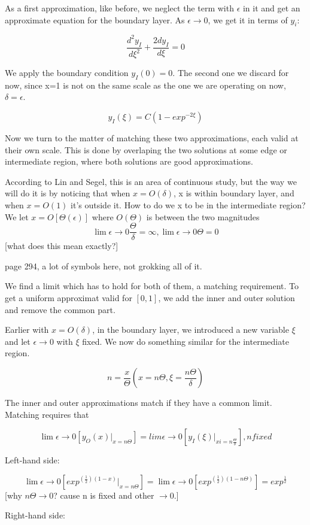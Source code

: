 \documentclass[12pt]{report}
\begin{document}
As a first approximation, like before, we neglect the term with
$\epsilon$ in it and get an approximate equation for the boundary
layer. As $\epsilon \to 0$, we get it in terms of $y_i$:

$$\frac{d^2y_I}{d\xi^2} + \frac{2dy_I}{d\xi} = 0$$

We apply the boundary condition $y_I(0) = 0$. The second one we
discard for now, since x=1 is not on the same scale as the one we are
operating on now, $\delta=\epsilon$.

$$y_I(\xi) = C(1-exp^{-2\xi})$$

Now we turn to the matter of matching these two approximations, each
valid at their own scale. This is done by overlaping the two solutions
at some edge or intermediate region, where both solutions are good
approximations.

According to Lin and Segel, this is an area of continuous study, but
the way we will do it is by noticing that when $x=O(\delta)$, x is
within boundary layer, and when $x=O(1)$ it's outside it. How to do we
x to be in the intermediate region? We let $x=O[\Theta(\epsilon)]$
where $O(\Theta)$ is between the two magnitudes $$\lim \epsilon \to 0 \frac \Theta \delta = \infty, \lim \epsilon \to
0 \Theta = 0$$ [what does this mean exactly?]

page 294, a lot of symbols here, not grokking all of it.

We find a limit which has to hold for both of them, a matching
requirement. To get a uniform approximat valid for $[0,1]$, we add the
inner and outer solution and remove the common part.

Earlier with $x=O(\delta)$, in the boundary layer, we introduced a new
variable $\xi$ and let $\epsilon \to 0$ with $\xi$ fixed. We now do
something similar for the intermediate region.

$$n = \frac x \Theta (x = n \Theta, \xi = \frac{n \Theta}{\delta})$$

The inner and outer approximations match if they have a common
limit. Matching requires that

$$\lim \epsilon \to 0[y_O(x) |_{x=n \Theta}] = lim \epsilon \to
0[y_I(\xi)|_{xi=n \frac \Theta \delta}], n fixed$$

Left-hand side:

$$\lim \epsilon \to 0[exp^{(\frac 1 2)(1-x)} |_{x=n \Theta}] = \lim
\epsilon \to 0[exp^{(\frac 1 2)(1- n \Theta)}] = exp^{\frac 1 2} $$
[why $n \Theta \to 0$?  cause n is fixed and other $\to 0$.]

Right-hand side:
\end{document}
